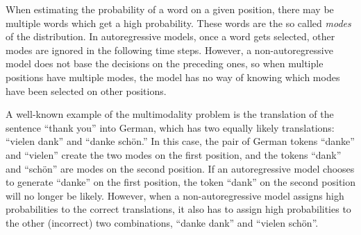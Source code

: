 When estimating the probability of a word on a given position, there may be
multiple words which get a high probability. These words are the so called
\emph{modes} of the distribution. In autoregressive models, once a word gets
selected, other modes are ignored in the following time steps. However, a
non-autoregressive model does not base the decisions on the preceding ones, so
when multiple positions have multiple modes, the model has no way of knowing
which modes have been selected on other positions.




A well-known example of the multimodality problem is the translation of the
sentence ``thank you'' into German, which has two equally likely translations:
``vielen dank'' and ``danke schön.'' In this case, the pair of German tokens
``danke'' and ``vielen'' create the two modes on the first position, and the
tokens ``dank'' and ``schön'' are modes on the second position. If an
autoregressive model chooses to generate ``danke'' on the first position, the
token ``dank'' on the second position will no longer be likely. However, when a
non-autoregressive model assigns high probabilities to the correct
translations, it also has to assign high probabilities to the other (incorrect)
two combinations, ``danke dank'' and ``vielen schön''.

